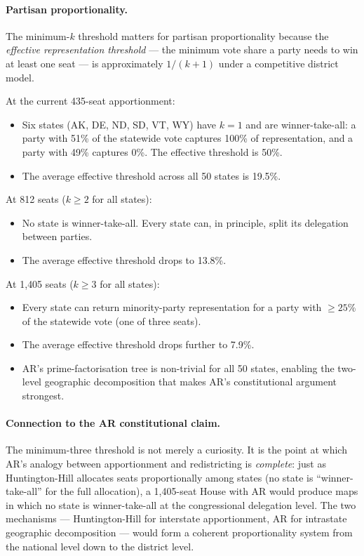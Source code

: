 \paragraph{Partisan proportionality.}
The minimum-$k$ threshold matters for partisan proportionality because
the \emph{effective representation threshold} --- the minimum vote share
a party needs to win at least one seat --- is approximately $1/(k+1)$
under a competitive district model.

At the current 435-seat apportionment:
\begin{itemize}
\item Six states (AK, DE, ND, SD, VT, WY) have $k = 1$ and are
  winner-take-all: a party with 51\% of the statewide vote captures
  100\% of representation, and a party with 49\% captures 0\%.
  The effective threshold is 50\%.
\item The average effective threshold across all 50 states is 19.5\%.
\end{itemize}

At 812 seats ($k \geq 2$ for all states):
\begin{itemize}
\item No state is winner-take-all.
  Every state can, in principle, split its delegation between parties.
\item The average effective threshold drops to 13.8\%.
\end{itemize}

At 1{,}405 seats ($k \geq 3$ for all states):
\begin{itemize}
\item Every state can return minority-party representation for a party
  with $\geq 25$\% of the statewide vote (one of three seats).
\item The average effective threshold drops further to 7.9\%.
\item AR's prime-factorisation tree is non-trivial for all 50 states,
  enabling the two-level geographic decomposition that makes AR's
  constitutional argument strongest.
\end{itemize}

\paragraph{Connection to the AR constitutional claim.}
The minimum-three threshold is not merely a curiosity.
It is the point at which AR's analogy between apportionment and redistricting
is \emph{complete}: just as Huntington-Hill allocates seats proportionally
among states (no state is ``winner-take-all'' for the full allocation),
a 1{,}405-seat House with AR would produce maps in which no state is
winner-take-all at the congressional delegation level.
The two mechanisms --- Huntington-Hill for interstate apportionment,
AR for intrastate geographic decomposition --- would form a coherent
proportionality system from the national level down to the district level.

